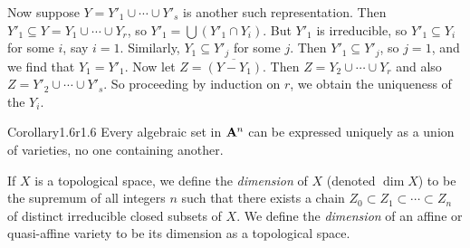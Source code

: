{Now suppose $Y=Y'_1\cup\cdots\cup Y'_s$ is another such representation. Then $Y'_1\subseteq Y=Y_1\cup\cdots\cup Y_r$, so $Y'_1=\bigcup(Y'_1\cap Y_i)$. But $Y'_1$ is irreducible, so $Y'_1\subseteq Y_i$ for some $i$, say $i=1$. Similarly, $Y_1\subseteq Y'_j$ for some $j$. Then $Y'_1\subseteq Y'_j$, so $j=1$, and we find that $Y_1=Y'_1$. Now let $Z=\overline{(Y-Y_1)}$. Then $Z=Y_2\cup\cdots\cup Y_r$ and also $Z=Y'_2\cup\cdots\cup Y'_s$. So proceeding by induction on $r$, we obtain the uniqueness of the $Y_i$.

\begin{result}{Corollary}{1.6}{r1.6}
Every algebraic set in $\AffSpace{n}$ can be expressed uniquely as a union of varieties, no one containing another.
\end{result}

\Dfn If $X$ is a topological space, we define the \emph{dimension} of $X$ (denoted $\dim X$) to be the supremum of all integers $n$ such that there exists a chain $Z_0\subset Z_1\subset\cdots\subset Z_n$ of distinct irreducible closed subsets of $X$. We define the \emph{dimension} of an affine or quasi-affine variety to be its dimension as a topological space.
}

